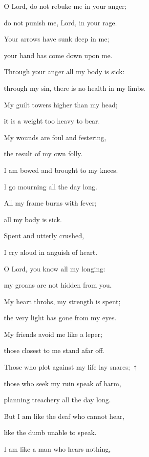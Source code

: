 \noindent O Lord, do not rebuke me in your anger;~\GreStar{}~\nopagebreak

do not punish me, Lord, in your rage.

\noindent Your arrows have sunk deep in me;~\GreStar{}~\nopagebreak

your hand has come down upon me.

\noindent Through your anger all my body is sick:~\GreStar{}~\nopagebreak

through my sin, there is no health in my limbs.

\noindent My guilt towers higher than my head;~\GreStar{}~\nopagebreak

it is a weight too heavy to bear.

\noindent My wounds are foul and festering,~\GreStar{}~\nopagebreak

the result of my own folly.

\noindent I am bowed and brought to my knees.~\GreStar{}~\nopagebreak

I go mourning all the day long.

\noindent All my frame burns with fever;~\GreStar{}~\nopagebreak

all my body is sick.

\noindent Spent and utterly crushed,~\GreStar{}~\nopagebreak

I cry aloud in anguish of heart.

\noindent O Lord, you know all my longing:~\GreStar{}~\nopagebreak

my groans are not hidden from you.

\noindent My heart throbs, my strength is spent;~\GreStar{}~\nopagebreak

the very light has gone from my eyes.

\noindent My friends avoid me like a leper;~\GreStar{}~\nopagebreak

those closest to me stand afar off.

\noindent Those who plot against my life lay snares;~†~\nopagebreak

those who seek my ruin speak of harm,~\GreStar{}~\nopagebreak

planning treachery all the day long.

\noindent But I am like the deaf who cannot hear,~\GreStar{}~\nopagebreak

like the dumb unable to speak.

\noindent I am like a man who hears nothing,~\GreStar{}~\nopagebreak

